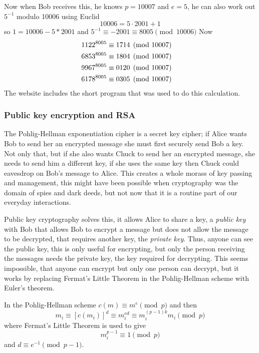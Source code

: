 \documentclass[12pt]{article}
\begin{document}
Now when Bob receives this, he knows $p=10007$ and $e=5$, he can also work out $5^{-1}$ modulo 10006 using Euclid
\begin{equation}
10006=5\cdot 2001+1
\end{equation}
so $1=10006-5*2001$ and $5^{-1}\equiv -2001\equiv 8005\pmod{10006}$
Now
\begin{eqnarray}
1122^{8005}&\equiv 1714 \pmod{10007}\cr
6853^{8005}&\equiv 1804 \pmod{10007}\cr
9967^{8005}&\equiv 0120 \pmod{10007}\cr
6178^{8005}&\equiv 0305 \pmod{10007}
\end{eqnarray}
The website includes the short program that was used to do this calculation.

\subsubsection*{Public key encryption and RSA}

The Pohlig-Hellman exponentiation cipher is a secret key cipher; if
Alice wants Bob to send her an encrypted message she must first
securely send Bob a key. Not only that, but if she also wants Chuck to
send her an encrypted message, she needs to send him a different key,
if she uses the same key then Chuck could eavesdrop on Bob's message
to Alice. This creates a whole morass of key passing and management,
this might have been possible when cryptography was the domain of
spies and dark deeds, but not now that it is a routine part of our
everyday interactions. 

Public key cryptography solves this, it allows Alice to share a key, a
\textsl{public key} with Bob that allows Bob to encrypt a message but
does not allow the message to be decrypted, that requires another key,
the \textsl{private key}. Thus, anyone can see the public key, this is
only useful for encrypting, but only the person receiving the messages
needs the private key, the key required for decrypting. This seems
impossible, that anyone can encrypt but only one person can decrypt,
but it works by replacing Fermat's Little Theorem in the
Pohlig-Hellman scheme with Euler's theorem.

In the Pohlig-Hellman scheme $c(m)\equiv m^e\pmod{p}$ and then
\begin{equation}
m_i\equiv [c(m_i)]^d\equiv m_i^{ed}\equiv m_i^{(p-1)k}m_i\pmod{p}
\end{equation}
where Fermat's Little Theorem is used to give
\begin{equation}
m_i^{p-1}\equiv 1 \pmod{p}
\end{equation}
and $d\equiv e^{-1}\pmod{p-1}$. 
\end{document}
